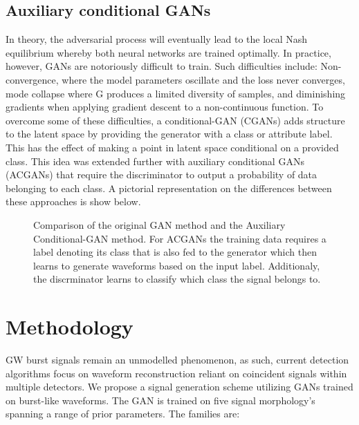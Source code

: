 \documentclass[12pt]{iopart}
\begin{document}
\subsection{Auxiliary conditional GANs}
In theory, the adversarial process will eventually lead to the local Nash equilibrium \cite{Nash1950} whereby
both neural networks are trained optimally. In practice, however, GANs are
notoriously difficult to train. Such difficulties include: Non-convergence,
where the model parameters oscillate and the loss never converges, mode
collapse where G produces a limited diversity of samples, and diminishing
gradients when applying gradient descent to a
non-continuous function. To overcome some of these difficulties, a conditional-GAN (CGANs) \cite{cgan}
adds structure to the latent space by providing the generator with a class or attribute
label. This has the effect of making a point in latent space conditional on a
provided class. This idea was extended further with auxiliary conditional GANs (ACGANs) \cite{odena2016conditional} that require the discriminator to output a
probability of data belonging to each class. A pictorial representation on the differences between these approaches is show below. 

\begin{figure}
    \centering
    \caption{Comparison of the original GAN method and the Auxiliary Conditional-GAN method. For ACGANs the training data requires a label denoting its class that is also fed to the generator which then learns to generate waveforms based on the input label. Additionaly, the discrminator learns to classify which class the signal belongs to.}
\end{figure}

\section{Methodology}
GW burst signals remain an unmodelled phenomenon, as such, current detection algorithms focus on waveform reconstruction reliant on coincident signals within multiple detectors. We propose a signal generation scheme utilizing GANs trained on burst-like waveforms. The GAN is trained on five signal morphology's spanning a range of prior parameters. The families are:
\end{document}
